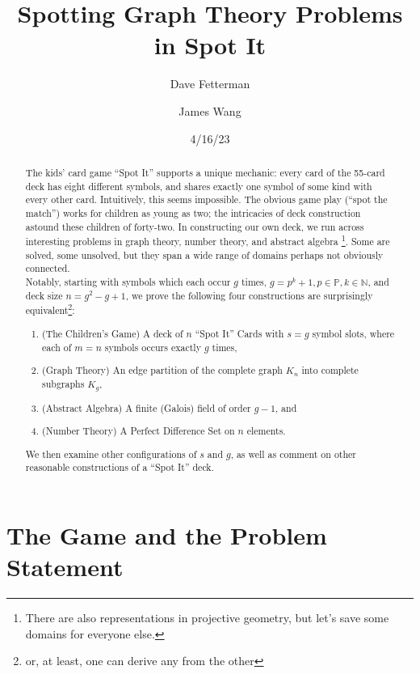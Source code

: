 \documentclass[11pt, oneside]{article} 	%
\title{Spotting Graph Theory Problems in Spot It}
\author[1]{Dave Fetterman}
\author[2]{James Wang}
\affil[1]{Obviously Unemployed}
\affil[2]{Surprisingly Employed}
\date{4/16/23}
\begin{document}
\maketitle

\begin{abstract}

The kids' card game ``Spot It'' supports a unique mechanic: every card of the 55-card deck has eight different symbols, and shares exactly one symbol of some kind with every other card. Intuitively, this seems impossible. The obvious game play (``spot the match'') works for children as young as two; the intricacies of deck construction astound these children of forty-two. In constructing our own deck, we run across interesting problems in graph theory, number theory, and abstract algebra \footnote{There are also representations in projective geometry, but let's save some domains for everyone else.}. Some are solved, some unsolved, but they span a wide range of domains perhaps not obviously connected.
\\

Notably, starting with symbols which each occur $g$ times, $g=p^k+1, p \in \mathbb{P}, k \in \mathbb{N}$, and deck size $n = g^2-g+1$, we prove the following four constructions are surprisingly equivalent\footnote{or, at least, one can derive any from the other}:
\\
\begin{enumerate}
\item (The Children's Game) A deck of $n$ ``Spot It'' Cards with $s=g$ symbol slots, where each of $m = n$ symbols occurs exactly $g$ times,
\item (Graph Theory) An edge partition of the complete graph $K_n$ into complete subgraphs $K_g$,
\item (Abstract Algebra) A finite (Galois) field of order $g-1$, and
\item (Number Theory) A Perfect Difference Set\cite{1} on $n$ elements.
\end{enumerate} 
 
We then examine other configurations of $s$ and $g$, as well as comment on other reasonable constructions of a ``Spot It'' deck.

\end{abstract}

\section{The Game and the Problem Statement}
\end{document}
